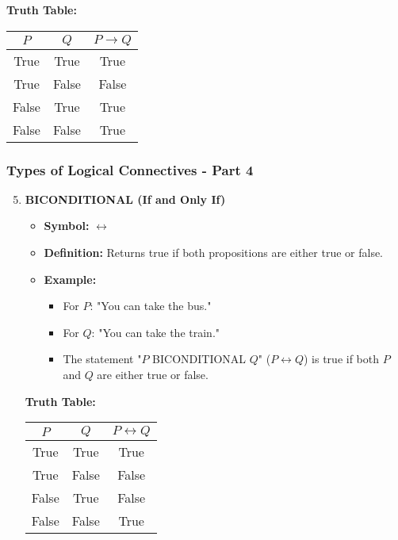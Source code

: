 \documentclass[aspectratio=169]{beamer}
\begin{document}
\begin{frame}[fragile]
\begin{enumerate}
\begin{itemize}
            \end{itemize}
            \textbf{Truth Table:}
            \begin{tabular}{|c|c|c|}
                \hline
                $P$ & $Q$ & $P \rightarrow Q$ \\
                \hline
                True  & True  & True  \\
                True  & False & False \\
                False & True  & True  \\
                False & False & True  \\
                \hline
            \end{tabular}
    \end{enumerate}
\end{frame}

\begin{frame}[fragile]
    \frametitle{Types of Logical Connectives - Part 4}
    \begin{enumerate}
        \setcounter{enumi}{4} %
        \item \textbf{BICONDITIONAL (If and Only If)}
            \begin{itemize}
                \item \textbf{Symbol:} $\leftrightarrow$
                \item \textbf{Definition:} Returns true if both propositions are either true or false.
                \item \textbf{Example:}
                \begin{itemize}
                    \item For $P$: "You can take the bus."
                    \item For $Q$: "You can take the train."
                    \item The statement "$P$ BICONDITIONAL $Q$" ($P \leftrightarrow Q$) is true if both $P$ and $Q$ are either true or false.
                \end{itemize}
            \end{itemize}
            \textbf{Truth Table:}
            \begin{tabular}{|c|c|c|}
                \hline
                $P$ & $Q$ & $P \leftrightarrow Q$ \\
                \hline
                True  & True  & True  \\
                True  & False & False \\
                False & True  & False \\
                False & False & True  \\
                \hline
            \end{tabular}
    \end{enumerate}
\end{frame}
\end{document}
